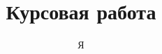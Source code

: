 \documentclass[12pt]{article}
\begin{document}
    \title{Курсовая работа}
    \author{Я}
    \maketitle

    \clearpage
    
    \tableofcontents

       
\end{document}
